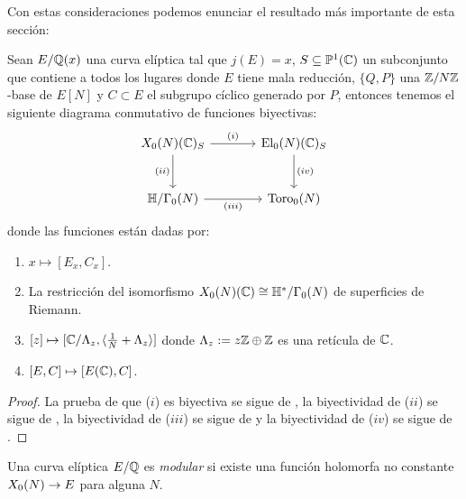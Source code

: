 \documentclass[../../tesis_maestria]{subfiles}
\begin{document}
Con estas consideraciones podemos enunciar el resultado m\'as importante de esta secci\'on:
\begin{thm}
  Sean $E/\mathbb{Q}(x)$ una curva el\'iptica tal que $j(E)=x$, $S\subseteq\mathbb{P}^1(\mathbb{C})$ un subconjunto
  que contiene a todos los lugares donde $E$ tiene mala reducci\'on, $\{Q,P\}$ una $\mathbb{Z}/N\mathbb{Z}$-base
  de $E[N]$ y $C\subset E$ el subgrupo c\'iclico generado por $P$, entonces tenemos el siguiente
  diagrama conmutativo de funciones biyectivas:
  \[
    \begin{tikzcd}[column sep=large, row sep=large]
      X_0(N)(\CC)_S \arrow[r,"(i)"] \arrow[d,"(ii)"'] &
      \mathrm{El}_0(N)(\CC)_S \arrow[d,"(iv)"] \\
      \HH/\Gamma_0(N) \arrow[r,"(iii)"'] & \mathrm{Toro}_0(N)
    \end{tikzcd}
  \]
  donde las funciones est\'an dadas por:
  \begin{enumerate}[label=\emph{\roman*})]
  \item $x\mapsto [E_x,C_x]$.
  \item La restricci\'on del isomorfismo $X_0(N)(\mathbb{C})\cong\mathbb{H}^*/\Gamma_0(N)$ de superficies de
    Riemann.
  \item $[z]\mapsto [\mathbb{C}/\Lambda_z,\langle \tfrac{1}{N}+\Lambda_z \rangle]$ donde $\Lambda_z:=z\mathbb{Z}\oplus\mathbb{Z}$
    es una ret\'icula de $\mathbb{C}$.
  \item $[E,C]\mapsto [E(\mathbb{C}),C]$.
  \end{enumerate}
\end{thm}

\begin{proof}
  La prueba de que ($i$) es biyectiva se sigue de
  \cite[cap\'itulo III, \S1.3, proposici\'on 1]{CornellMFAFLT}, la biyectividad de ($ii$) se sigue
  de \cite[cap\'itulo III, \S1.10, proposici\'on 6]{CornellMFAFLT}, la biyectividad de ($iii$) se
  sigue de \cite[cap\'itulo III, \S1.10, proposici\'on 7]{CornellMFAFLT} y la biyectividad de
  ($iv$) se sigue de \cite[cap\'itulo III, \S1.8, proposici\'on 5]{CornellMFAFLT}.
\end{proof}

\begin{defin}
  Una curva el\'iptica $E/\mathbb{Q}$ es \emph{modular} si existe una funci\'on holomorfa no constante
  $X_0(N)\rightarrow E$ para alguna $N$.
\end{defin}
\end{document}
